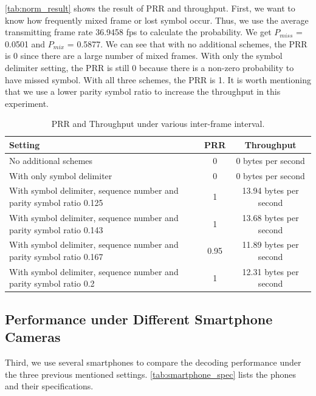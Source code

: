 \autoref{tab:norm_result} shows the result of PRR and throughput.
First, we want to know how frequently mixed frame or lost symbol occur. Thus, we use the average transmitting frame rate 36.9458 fps to calculate the probability. We get $P_{miss}$ = 0.0501 and $P_{mix}$ = 0.5877.
We can see that with no additional schemes, the PRR is 0 since there are a large number of mixed frames. With only the symbol delimiter setting, the PRR is still 0 because there is a non-zero probability to have missed symbol. With all three schemes, the PRR is 1. It is worth mentioning that we use a lower parity symbol ratio to increase the throughput in this experiment.

\begin{table}[!htb]
\centering
\caption{PRR and Throughput under various inter-frame interval.}
        \begin{tabular}{lcc}
        \hline Setting & PRR & Throughput\\ 
        \hline \hline
        No additional schemes & 0 & 0 bytes per second\\
        With only symbol delimiter   & 0 & 0 bytes per second \\
        With symbol delimiter, sequence number and parity symbol ratio 0.125 & 1 & 13.94 bytes per second\\
        With symbol delimiter, sequence number and parity symbol ratio 0.143 & 1 & 13.68 bytes per second\\
        With symbol delimiter, sequence number and parity symbol ratio 0.167 & 0.95 & 11.89 bytes per second\\
        With symbol delimiter, sequence number and parity symbol ratio 0.2 & 1 & 12.31 bytes per second\\
        \hline
        \end{tabular}
        \label{tab:norm_result}
\end{table}

\subsection{Performance under Different Smartphone Cameras}
Third, we use several smartphones to compare the decoding performance under the three previous mentioned settings. \autoref{tab:smartphone_spec} lists the phones and their specifications. 

